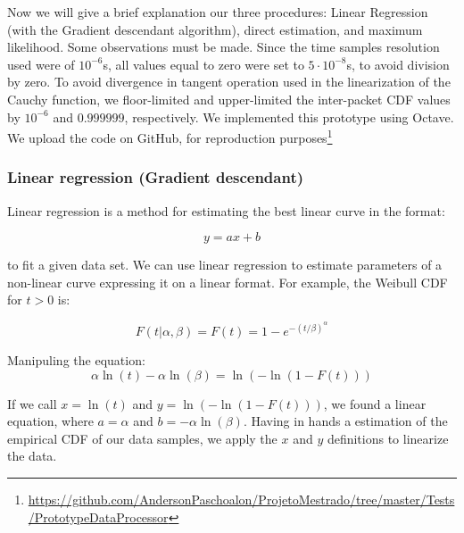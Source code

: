 Now we will give a brief explanation our three procedures: Linear Regression (with the  Gradient descendant algorithm), direct estimation, and maximum likelihood. Some observations must be made. Since the time samples resolution used were of $10^{-6}$s, all values equal to zero were set to  $5\cdot10^{-8}$s, to avoid division by zero. To avoid divergence in tangent operation used in the linearization of the Cauchy function, we floor-limited and upper-limited the inter-packet CDF  values by  $10^{-6}$ and $0.999999$, respectively. We implemented this prototype using Octave. We upload the code on GitHub, for reproduction purposes\footnote{\href{https://github.com/AndersonPaschoalon/ProjetoMestrado/tree/master/Tests/PrototypeDataProcessor}{https://github.com/AndersonPaschoalon/ProjetoMestrado/tree/master/Tests/PrototypeDataProcessor}}


\subsubsection{Linear regression (Gradient descendant)}

Linear regression is a method for estimating the best linear curve in the format:

\begin{equation}
y = ax + b
\end{equation}

to fit a given data set. We can use linear regression to estimate parameters of a non-linear curve expressing it on a linear format. For example, the Weibull CDF for $t > 0$ is:

\begin{equation}
F(t|\alpha, \beta) = F(t) = 1 - e^{-(t/\beta)^{\alpha}}
\end{equation}

Manipuling the equation:
\begin{equation}
\alpha\ln{(t)} - \alpha\ln{(\beta)} = \ln{(-\ln{(1 - F(t))})}
\end{equation}


If we call $x = \ln{(t)}$ and $y = \ln{(-\ln{(1 - F(t))})}$, we found a linear equation, where $a = \alpha$ and $b = -\alpha\ln{(\beta)}$. Having in hands a estimation of the empirical CDF of our data samples, we apply the $x$ and $y$ definitions to linearize the data. 

